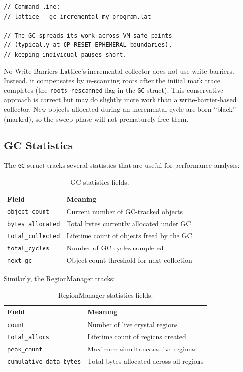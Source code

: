 \begin{lstlisting}[language=Lattice, caption={Incremental GC for lower latency}]
// Command line:
// lattice --gc-incremental my_program.lat

// The GC spreads its work across VM safe points
// (typically at OP_RESET_EPHEMERAL boundaries),
// keeping individual pauses short.
\end{lstlisting}

\begin{notebox}{No Write Barriers}
Lattice's incremental collector does not use write barriers.
Instead, it compensates by re-scanning roots after the initial mark trace completes (the \lstinline|roots_rescanned| flag in the \lstinline|GC| struct).
This conservative approach is correct but may do slightly more work than a write-barrier-based collector.
New objects allocated during an incremental cycle are born ``black'' (marked), so the sweep phase will not prematurely free them.
\end{notebox}

\subsection{GC Statistics}

The \lstinline|GC| struct tracks several statistics that are useful for performance analysis:

\begin{table}[h]
\centering
\begin{tabular}{ll}
\toprule
\textbf{Field} & \textbf{Meaning} \\
\midrule
\lstinline|object_count| & Current number of GC-tracked objects \\
\lstinline|bytes_allocated| & Total bytes currently allocated under GC \\
\lstinline|total_collected| & Lifetime count of objects freed by the GC \\
\lstinline|total_cycles| & Number of GC cycles completed \\
\lstinline|next_gc| & Object count threshold for next collection \\
\bottomrule
\end{tabular}
\caption{GC statistics fields.}\label{tab:gc-stats}
\end{table}

Similarly, the RegionManager tracks:

\begin{table}[h]
\centering
\begin{tabular}{ll}
\toprule
\textbf{Field} & \textbf{Meaning} \\
\midrule
\lstinline|count| & Number of live crystal regions \\
\lstinline|total_allocs| & Lifetime count of regions created \\
\lstinline|peak_count| & Maximum simultaneous live regions \\
\lstinline|cumulative_data_bytes| & Total bytes allocated across all regions \\
\bottomrule
\end{tabular}
\caption{RegionManager statistics fields.}\label{tab:region-stats}
\end{table}

